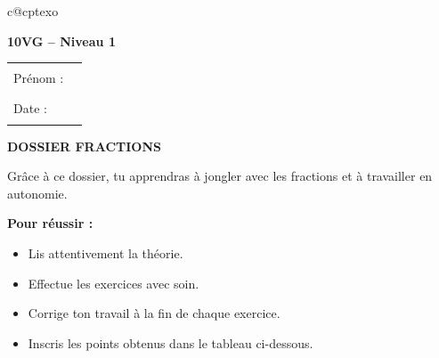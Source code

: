 

\providecommand{\Case}{\,\fbox{\rule{0pt}{2.1ex}\hspace{0.7cm}}\,}
\providecommand{\CaseC}{\,\fbox{\rule{0pt}{2.1ex}\hspace{0.4cm}}\,}
\providecommand{\ItemGuide}[1]{\vspace{4pt}\par\noindent\fcolorbox{themeNO}{themeNO!10}{\parbox{\dimexpr\linewidth-2\fboxsep-2\fboxrule\relax}{\vspace{2pt}#1\vspace{2pt}}}\par\vspace{6pt}}
\providecommand{\FA}[2]{\dfrac{\vphantom{\CaseC}#1}{\vphantom{\CaseC}#2}}

\ifcsname c@cptexo\endcsname\else{}\fi
\setcounter{cptexo}{0}
\providecommand{\Exo}[2]{\refstepcounter{cptexo}\label{#1}\textbf{Exercice \thecptexo.} #2}

\clearpage
\thispagestyle{empty}
\textbf{10VG -- Niveau 1}\hfill
\begin{tabularx}{0.4\textwidth}{Xl}
Prénom :& \rule{4cm}{0.4pt}\\[3mm]
Date : &\rule{4cm}{0.4pt}
\end{tabularx}

\vspace{8mm}
\begin{center}
\begin{tcolorbox}[colback=themeNO!30,colframe=themeNO!65!black,halign=flush center,width=0.6\textwidth,arc=3mm,boxsep=3mm]
{\Huge\bfseries\color{themeNO!65!black} DOSSIER FRACTIONS}
\end{tcolorbox}
\end{center}


\vspace{7mm}
\begin{tcolorbox}[colback=themeNO!10,colframe=themeNO!65!black]
Grâce à ce dossier, tu apprendras à jongler avec les fractions et à travailler en autonomie.

\vspace{3mm}
\textbf{Pour réussir :}
\begin{itemize}[itemsep=1mm, topsep=1mm,label=\rhd]
\item Lis attentivement la théorie.
\item Effectue les exercices avec soin.
\item Corrige ton travail à la fin de chaque exercice.
\item Inscris les points obtenus dans le tableau ci-dessous.
\end{itemize}
\end{tcolorbox}

